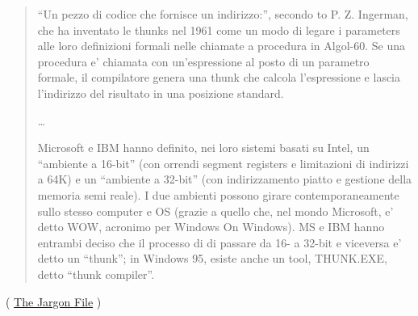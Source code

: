 \begin{framed}
\begin{quotation}
“Un pezzo di codice che fornisce un indirizzo:”, secondo to P. Z. Ingerman, 
che ha inventato le thunks nel 1961 come un modo di legare i parameters alle loro definizioni formali 
nelle chiamate a procedura in Algol-60. Se una procedura e' chiamata con un'espressione al posto di un parametro formale,
il compilatore genera una thunk che calcola l'espressione e lascia l'indirizzo del risultato in una posizione standard.

\dots

Microsoft e IBM hanno definito, nei loro sistemi basati su Intel, un “ambiente a 16-bit” 
(con orrendi segment registers e limitazioni di indirizzi a 64K) e un “ambiente a 32-bit” 
(con indirizzamento piatto e gestione della memoria semi reale). I due ambienti possono girare contemporaneamente
sullo stesso computer e OS (grazie a quello che, nel mondo Microsoft, e' detto WOW, acronimo per Windows On Windows).
MS e IBM hanno entrambi deciso che il processo di di passare da 16- a 32-bit e viceversa e' detto un “thunk”; in Windows 95, 
esiste anche un tool, THUNK.EXE, detto “thunk compiler”.
\end{quotation}
\end{framed}
( \href{http://go.yurichev.com/17362}{The Jargon File} )
